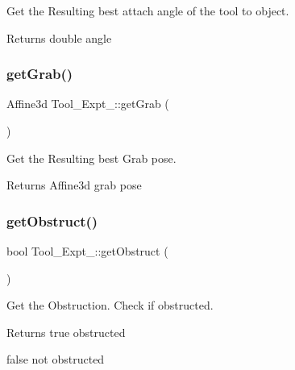 Get the Resulting best attach angle of the tool to object. 

\begin{DoxyReturn}{Returns}
double angle 
\end{DoxyReturn}
\mbox{\label{classTool__Expt__2_a5952622f42e4bc903c46180eb63142ee}} 
\subsubsection{\texorpdfstring{get\+Grab()}{getGrab()}}
{\footnotesize\ttfamily Affine3d Tool\+\_\+\+Expt\+\_\+::get\+Grab (\begin{DoxyParamCaption}{ }\end{DoxyParamCaption})\hspace{0.3cm}{\ttfamily [inline]}}



Get the Resulting best Grab pose. 

\begin{DoxyReturn}{Returns}
Affine3d grab pose 
\end{DoxyReturn}
\mbox{\label{classTool__Expt__2_a4f325224bd61c8d68d562a02f84d90c3}} 
\subsubsection{\texorpdfstring{get\+Obstruct()}{getObstruct()}}
{\footnotesize\ttfamily bool Tool\+\_\+\+Expt\+\_\+::get\+Obstruct (\begin{DoxyParamCaption}{ }\end{DoxyParamCaption})\hspace{0.3cm}{\ttfamily [inline]}}



Get the Obstruction. Check if obstructed. 

\begin{DoxyReturn}{Returns}
true obstructed 

false not obstructed 
\end{DoxyReturn}
\mbox{\label{classTool__Expt__2_ae984275561905b857cf025239efc0a2c}} 
